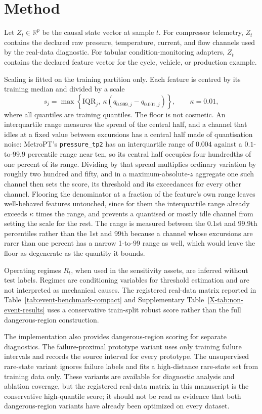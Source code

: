 \section{Method}
\label{sec:method}

Let \(Z_t\in\mathbb{R}^p\) be the causal state vector at sample \(t\). For compressor telemetry, \(Z_t\) contains the declared raw pressure, temperature, current, and flow channels used by the real-data diagnostic. For tabular condition-monitoring adapters, \(Z_t\) contains the declared feature vector for the cycle, vehicle, or production example.

Scaling is fitted on the training partition only. Each feature is centred by its training median and divided by a scale
\[
    s_j=\max\!\left\{\mathrm{IQR}_j,\ \kappa\left(q_{0.999,j}-q_{0.001,j}\right)\right\},\qquad \kappa=0.01,
\]
where all quantiles are training quantiles. The floor is not cosmetic. An interquartile range measures the spread of the central half, and a channel that idles at a fixed value between excursions has a central half made of quantisation noise: MetroPT's \texttt{pressure\_tp2} has an interquartile range of \(0.004\) against a \(0.1\)-to-\(99.9\) percentile range near ten, so its central half occupies four hundredths of one percent of its range. Dividing by that spread multiplies ordinary variation by roughly two hundred and fifty, and in a maximum-absolute-\(z\) aggregate one such channel then sets the score, its threshold and its exceedances for every other channel. Flooring the denominator at a fraction of the feature's own range leaves well-behaved features untouched, since for them the interquartile range already exceeds \(\kappa\) times the range, and prevents a quantised or mostly idle channel from setting the scale for the rest. The range is measured between the \(0.1\)st and \(99.9\)th percentiles rather than the 1st and 99th because a channel whose excursions are rarer than one percent has a narrow 1-to-99 range as well, which would leave the floor as degenerate as the quantity it bounds.

Operating regimes \(R_t\), when used in the sensitivity assets, are inferred without test labels. Regimes are conditioning variables for threshold estimation and are not interpreted as mechanical causes. The registered real-data matrix reported in Table~\ref{tab:event-benchmark-compact} and Supplementary Table~\ref{X-tab:non-event-results} uses a conservative train-split robust score rather than the full dangerous-region construction.

The implementation also provides dangerous-region scoring for separate diagnostics. The failure-proximal prototype variant uses only training failure intervals and records the source interval for every prototype. The unsupervised rare-state variant ignores failure labels and fits a high-distance rare-state set from training data only. These variants are available for diagnostic analysis and ablation coverage, but the registered real-data matrix in this manuscript is the conservative high-quantile score; it should not be read as evidence that both dangerous-region variants have already been optimized on every dataset.

